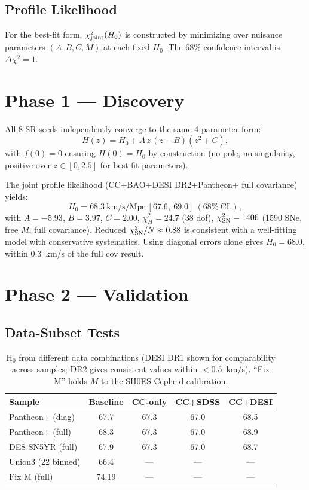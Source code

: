 \documentclass[twocolumn]{aastex631}
\begin{document}
\subsection{Profile Likelihood}
For the best-fit form, $\chi^2_{\rm joint}(H_0)$ is constructed by
minimizing over nuisance parameters $(A,B,C,M)$ at each fixed $H_0$.
The 68\% confidence interval is $\Delta\chi^2=1$.

\section{Phase 1 --- Discovery}
\label{sec:discovery}

All 8 SR seeds independently converge to the same 4-parameter form:
\[
H(z) = H_0 + A\,z\,(z-B)(z^2+C),
\]
with $f(0)=0$ ensuring $H(0)=H_0$ by construction (no pole, no
singularity, positive over $z\in[0,2.5]$ for best-fit parameters).

The joint profile likelihood (CC+BAO+DESI DR2+Pantheon+ full covariance)
yields:
\[
H_0 = 68.3\ \text{km/s/Mpc}\ [67.6,\ 69.0]\ (68\%\ \text{CL}),
\]
with $A=-5.93$, $B=3.97$, $C=2.00$,
$\chi^2_H=24.7$ (38 dof),
$\chi^2_{\rm SN}=1406$ (1590 SNe, free $M$, full covariance).
Reduced $\chi^2_{\rm SN}/N\approx0.88$ is consistent with a well-fitting
model with conservative systematics.  Using diagonal errors alone gives
$H_0=68.0$, within $0.3$~km/s of the full cov result.

\section{Phase 2 --- Validation}
\label{sec:validation}

\subsection{Data-Subset Tests}
\begin{table}
\centering
\caption{H$_0$ from different data combinations (DESI DR1 shown for
comparability across samples; DR2 gives consistent values within
$<0.5$~km/s).  ``Fix M'' holds $M$ to the SH0ES Cepheid calibration.}
\begin{tabular}{lcccc}
\hline
Sample & Baseline & CC-only & CC+SDSS & CC+DESI \\
\hline
Pantheon+ (diag)    & 67.7 & 67.3 & 67.0 & 68.5 \\
Pantheon+ (full)    & 68.3 & 67.3 & 67.0 & 68.9 \\
DES-SN5YR (full)    & 67.9 & 67.3 & 67.0 & 68.7 \\
Union3 (22 binned)  & 66.4 & ---  & ---  & ---  \\
 \hline
Fix M (full)        & 74.19 & ---  & ---  & ---  \\
\hline
\end{tabular}
\label{tab:subset}
\end{table}
\end{document}

